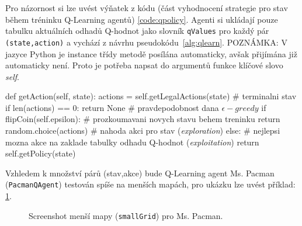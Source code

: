 Pro názornost si lze uvést výňatek z kódu (část vyhodnocení strategie pro stav během tréninku Q-Learning agentů) \ref{code:qpolicy}. Agenti si ukládají pouze tabulku aktuálních odhadů Q-hodnot jako slovník \texttt{qValues} pro každý pár \texttt{(state,action)} a vychází z návrhu pseudokódu~\ref{alg:qlearn}.
\newline POZNÁMKA: V jazyce Python je instance třídy metodě posílána automaticky, avšak přijímána již automaticky není. Proto je potřeba napsat do argumentů funkce klíčové slovo \textit{self}.

\begin{python}[label={code:qpolicy}]
def getAction(self, state):
   actions = self.getLegalActions(state)
   # terminalni stav
   if len(actions) == 0:
      return None
   # pravdepodobnost dana $\epsilon-greedy$ 
   if flipCoin(self.epsilon):
      # prozkoumavani novych stavu behem treninku
      return random.choice(actions) # nahoda akci pro stav (\textit{exploration})
   else:
      # nejlepsi mozna akce na zaklade tabulky odhadu Q-hodnot (\textit{exploitation})
      return self.getPolicy(state)
\end{python}

Vzhledem k množství párů (stav,akce) bude Q-Learning agent Ms. Pacman (\texttt{PacmanQAgent}) testován spíše na menších mapách, pro ukázku lze uvést příklad: \ref{img:smallL}.
\begin{figure}[!htbp]
\begin{center}
  \caption{Screenshot menší mapy (\texttt{smallGrid}) pro Ms. Pacman.}
  \label{img:smallL}
\end{center}
\end{figure}

